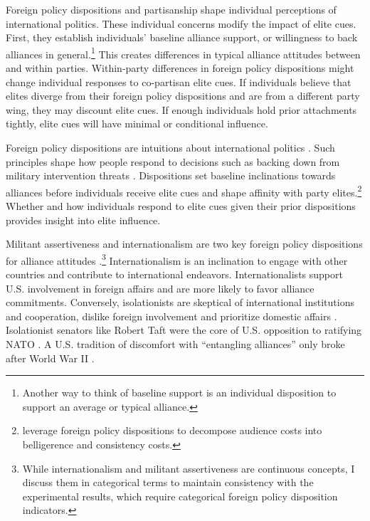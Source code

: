 \documentclass[12pt]{article}
\begin{document}
Foreign policy dispositions and partisanship shape individual perceptions of international politics. 
These individual concerns modify the impact of elite cues. 
First, they establish individuals' baseline alliance support, or willingness to back alliances in general.\footnote{Another way to think of baseline support is an individual disposition to support an average or typical alliance.} 
This creates differences in typical alliance attitudes between and within parties.
Within-party differences in foreign policy dispositions might change individual responses to co-partisan elite cues.
If individuals believe that elites diverge from their foreign policy dispositions and are from a different party wing, they may discount elite cues.  
If enough individuals hold prior attachments tightly, elite cues will have minimal or conditional influence.


Foreign policy dispositions are intuitions about international politics \citep{KertzerTingley2018}. 
Such principles shape how people respond to decisions such as backing down from military intervention threats \citep{KertzerBrutger2016}. 
Dispositions set baseline inclinations towards alliances before individuals receive elite cues and shape affinity with party elites.\footnote{\citet{KertzerBrutger2016} leverage foreign policy dispositions to decompose audience costs into belligerence and consistency costs.}
Whether and how individuals respond to elite cues given their prior dispositions provides insight into elite influence. 


Militant assertiveness and internationalism are two key foreign policy dispositions for alliance attitudes \citep{Herrmannetal1999}.\footnote{While internationalism and militant assertiveness are continuous concepts, I discuss them in categorical terms to maintain consistency with the experimental results, which require categorical foreign policy disposition indicators.}
Internationalism is an inclination to engage with other countries and contribute to international endeavors. 
Internationalists support U.S. involvement in foreign affairs and are more likely to favor alliance commitments. 
Conversely, isolationists are skeptical of international institutions and cooperation, dislike foreign involvement and prioritize domestic affairs \citep{Kertzer2013}. 
Isolationist senators like Robert Taft were the core of U.S. opposition to ratifying NATO \citep{Kaplan2007}.
A U.S. tradition of discomfort with ``entangling alliances'' only broke after World War II \citep{Kupchan2020}.
\end{document}
